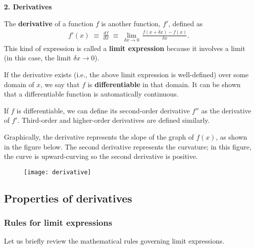\documentclass[10pt,a4paper]{article}
\begin{document}
\setcounter{page}{7}

\noindent
{\Large \textbf{2. Derivatives}}
\vskip 0.2in
\label{derivatives}

The \textbf{derivative} of a function $f$ is another function, $f'$,
defined as
\begin{align}
  f'(x) \;\equiv\; \frac{df}{dx} \;\equiv\; \lim_{\delta x \rightarrow 0} \, \frac{f(x + \delta x) - f(x)}{\delta x}.
\end{align}
This kind of expression is called a \textbf{limit expression} because
it involves a limit (in this case, the limit $\delta x \rightarrow
0$).

If the derivative exists (i.e., the above limit expression is
well-defined) over some domain of $x$, we say that $f$ is
\textbf{differentiable} in that domain.  It can be shown that a
differentiable function is automatically continuous.

If $f$ is differentiable, we can define its second-order derivative
$f''$ as the derivative of $f'$. Third-order and higher-order
derivatives are defined similarly.

Graphically, the derivative represents the slope of the graph of
$f(x)$, as shown in the figure below.  The second derivative
represents the curvature; in this figure, the curve is upward-curving
so the second derivative is positive.

\begin{figure}[h]
  \centering\texttt{[image: derivative]}
\end{figure}

\subsection{Properties of derivatives}
\label{properties-of-derivatives}

\subsubsection{Rules for limit expressions}
\label{rules-for-limit-expressions}

Let us briefly review the mathematical rules governing limit expressions.
\end{document}
